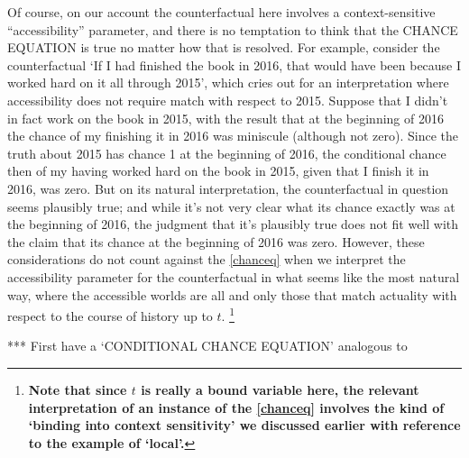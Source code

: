 \documentclass[leqno, 11pt, a5paper, openany]{article}
\begin{document}
Of course, on our account the counterfactual here involves a context-sensitive “accessibility” parameter, and there is no temptation to think that the CHANCE EQUATION is true no matter how that is resolved. For example, consider the counterfactual ‘If I had finished the book in 2016, that would have been because I worked hard on it all through 2015’, which cries out for an interpretation where accessibility does not require match with respect to 2015. Suppose that I didn't in fact work on the book in 2015, with the result that at the beginning of 2016 the chance of my finishing it in 2016 was miniscule (although not zero). Since the truth about 2015 has chance 1 at the beginning of 2016, the conditional chance then of my having worked hard on the book in 2015, given that I finish it in 2016, was zero. But on its natural interpretation, the counterfactual in question seems plausibly true; and while it's not very clear what its chance exactly was at the beginning of 2016, the judgment that it's plausibly true does not fit well with the claim that its chance at the beginning of 2016 was zero. However, these considerations do not count against the \ref{chanceq} when we interpret the accessibility parameter for the counterfactual in what seems like the most natural way, where the accessible worlds are all and only those that match actuality with respect to the course of history up to $t$.%
\footnote{\textbf{Note that since $t$ is really a bound variable here, the relevant interpretation of an instance of the \ref{chanceq} involves the kind of ‘binding into context sensitivity’ we discussed earlier with reference to the example of ‘local’.}}

*** First have a ‘CONDITIONAL CHANCE EQUATION’ analogous to 
\end{document}
